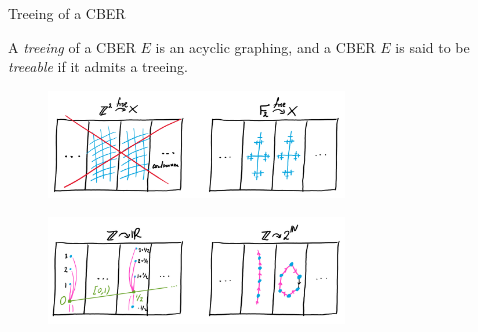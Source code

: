 \documentclass{beamer}
\begin{document}
    \begin{frame}{Treeing of a CBER}
        \begin{definition}
            A \textit{treeing} of a CBER $E$ is an acyclic graphing, and a CBER $E$ is said to be \textit{treeable} if it admits a treeing.
        \end{definition}

        \vspace{-0.13in}

        \begin{figure}[h]
            \center
            \includegraphics[width=0.7\textwidth]{img/not_treeable.png}
        \end{figure}
        \vspace{-0.2in}
        \begin{figure}[h]
            \center
            \includegraphics[width=0.7\textwidth]{img/smooth_hyperfinite.png}
        \end{figure}
    \end{frame}
\end{document}
